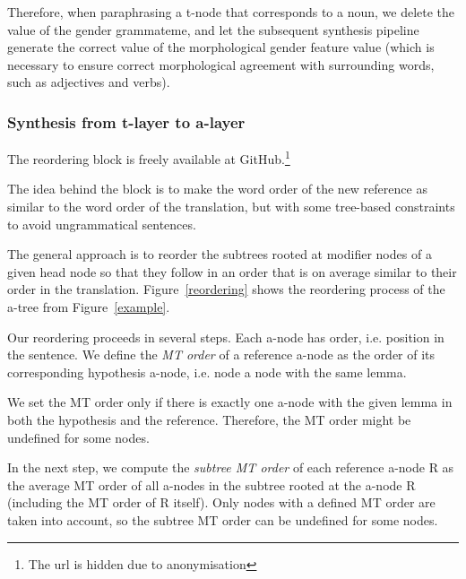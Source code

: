 \documentclass[11pt]{article}
\def\Fref#1{Figure~\ref{#1}}
\def\footurl#1{\footnote{\url{#1}}}
\begin{document}
Therefore, when paraphrasing a t-node that corresponds to a noun, we delete 
the value of the gender grammateme, and let the subsequent synthesis pipeline 
generate the correct value of the morphological gender feature value (which is 
necessary to ensure correct morphological agreement with surrounding words, 
such as adjectives and verbs).

\subsubsection{Synthesis from t-layer to a-layer}
The reordering block %
is freely available at 
GitHub.\footnote{The url is hidden due to anonymisation}

The idea behind the block is to make the word order of the new reference as 
similar to the word order of the translation, but with some tree-based 
constraints to avoid ungrammatical sentences. 

The general approach is to reorder the subtrees rooted at modifier nodes of a 
given head node so that they follow in an order that is on average similar to 
their order in the translation. \Fref{reordering} shows the reordering process 
of the a-tree from \Fref{example}.


Our reordering proceeds in several steps. Each a-node has order, i.e. position 
in the sentence.  We define the \emph{MT order} of a reference a-node as the 
order of its corresponding hypothesis a-node, i.e. node a node with the same 
lemma. 

We set the MT order only if there is exactly one a-node with the given lemma 
in both the hypothesis and the reference. Therefore, the MT order might be 
undefined for some nodes.

In the next step, we compute the \emph{subtree MT order} of each reference 
a-node R as the average MT order of all a-nodes in the subtree rooted at the 
a-node R (including the MT order of R itself). Only nodes with a defined MT 
order are taken into account, so the subtree MT order can be undefined for 
some nodes. 
\end{document}
